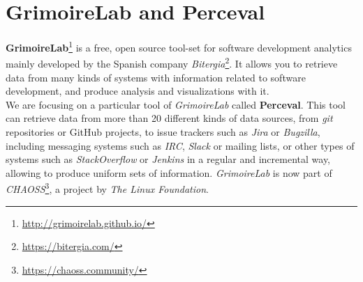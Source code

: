 \documentclass[a4paper, 12pt]{book}
\begin{document}
\section{GrimoireLab and Perceval}
\label{sec:grimoire}
\textbf{GrimoireLab}\footnote{\url{http://grimoirelab.github.io/}} is a free, open source tool-set for software development analytics
mainly developed by the Spanish company \emph{Bitergia}\footnote{\url{https://bitergia.com/}}.
It allows you to retrieve data from many kinds of systems with information related to software development, and produce
analysis and visualizations with it.\\
We are focusing on a particular tool of \emph{GrimoireLab} called \textbf{Perceval}. This tool can retrieve data from more
than 20 different kinds of data sources, from \emph{git} repositories or GitHub projects, to issue trackers such as \emph{Jira}
or \emph{Bugzilla}, including messaging systems such as \emph{IRC}, \emph{Slack} or mailing lists, or other types of systems such as
\emph{StackOverflow} or \emph{Jenkins} in a regular and incremental way, allowing to produce uniform sets of information.
\newline \emph{GrimoireLab} is now part of \emph{CHAOSS}\footnote{\url{https://chaoss.community/}}, a project by \emph{The Linux Foundation}.
\cleardoublepage
\end{document}
